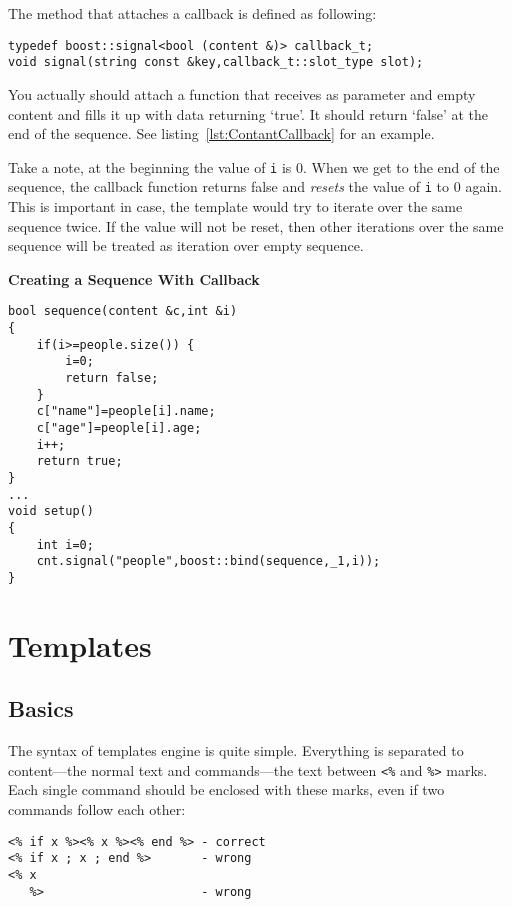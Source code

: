 \documentclass{article}
\newcommand{\tw}[1]{\texttt{#1}}
\renewcommand{\caption}[1]{\textbf{#1}}
\begin{document}
The method that attaches a callback is defined as following:

\begin{verbatim}
typedef boost::signal<bool (content &)> callback_t;
void signal(string const &key,callback_t::slot_type slot);
\end{verbatim}

You actually should attach a function that receives as parameter and empty content and fills it up with data returning `true'. It should return `false' at the end of the sequence. See listing~\ref{lst:ContantCallback} for an example.

Take a note, at the beginning the value of \tw{i} is 0. When we get to the end of the sequence, the callback function returns
false and \emph{resets} the value of \tw{i} to 0 again. This is important in case, the template would try to iterate
over the same sequence twice. If the value will not be reset, then other iterations over the same sequence will be
treated as iteration over empty sequence.

\begin{program}
\caption{Creating a Sequence With Callback\label{lst:ContantCallback}}
\begin{verbatim}
bool sequence(content &c,int &i)
{
    if(i>=people.size()) {
        i=0;
        return false;
    }
    c["name"]=people[i].name;
    c["age"]=people[i].age;
    i++;
    return true;
}
...
void setup()
{
    int i=0;
    cnt.signal("people",boost::bind(sequence,_1,i));
}
\end{verbatim}

\end{program}

\section{Templates}

\subsection{Basics}
The syntax of templates engine is quite simple. Everything is separated to content---the normal text and commands---the
text between \verb+<%+ and \verb+%>+ marks. Each single command should be enclosed with these marks, even if two commands follow each other:

\begin{verbatim}
<% if x %><% x %><% end %> - correct
<% if x ; x ; end %>       - wrong
<% x
   %>                      - wrong
\end{verbatim}
\end{document}
